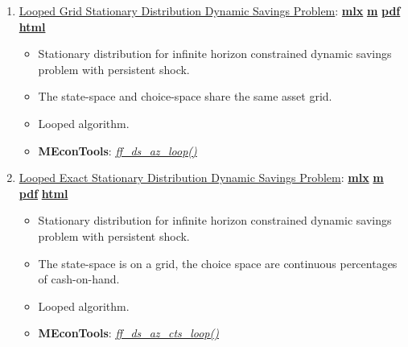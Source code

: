 \documentclass[
]{book}
\providecommand{\tightlist}{%
  \setlength{\itemsep}{0pt}\setlength{\parskip}{0pt}}
\begin{document}
\begin{enumerate}
\def\labelenumi{\arabic{enumi}.}
\tightlist
\item
  \href{https://fanwangecon.github.io/MEconTools/MEconTools/doc/ds/htmlpdfm/fx_ds_az_loop.html}{Looped Grid Stationary Distribution Dynamic Savings Problem}: \href{https://github.com/FanWangEcon/MEconTools/blob/master/MEconTools/doc/ds/fx_ds_az_loop.mlx}{\textbf{mlx}} \textbar{} \href{https://github.com/FanWangEcon/MEconTools/blob/master/MEconTools/doc/ds/htmlpdfm/fx_ds_az_loop.m}{\textbf{m}} \textbar{} \href{https://github.com/FanWangEcon/MEconTools/blob/master/MEconTools/doc/ds/htmlpdfm/fx_ds_az_loop.pdf}{\textbf{pdf}} \textbar{} \href{https://fanwangecon.github.io/MEconTools/MEconTools/doc/ds/htmlpdfm/fx_ds_az_loop.html}{\textbf{html}}

  \begin{itemize}
  \tightlist
  \item
    Stationary distribution for infinite horizon constrained dynamic savings problem with persistent shock.
  \item
    The state-space and choice-space share the same asset grid.
  \item
    Looped algorithm.
  \item
    \textbf{MEconTools}: \emph{\href{https://github.com/FanWangEcon/MEconTools/blob/master/MEconTools/ds/ff_ds_az_loop.m}{ff\_ds\_az\_loop()}}
  \end{itemize}
\item
  \href{https://fanwangecon.github.io/MEconTools/MEconTools/doc/ds/htmlpdfm/fx_ds_az_cts_loop.html}{Looped Exact Stationary Distribution Dynamic Savings Problem}: \href{https://github.com/FanWangEcon/MEconTools/blob/master/MEconTools/doc/ds/fx_ds_az_cts_loop.mlx}{\textbf{mlx}} \textbar{} \href{https://github.com/FanWangEcon/MEconTools/blob/master/MEconTools/doc/ds/htmlpdfm/fx_ds_az_cts_loop.m}{\textbf{m}} \textbar{} \href{https://github.com/FanWangEcon/MEconTools/blob/master/MEconTools/doc/ds/htmlpdfm/fx_ds_az_cts_loop.pdf}{\textbf{pdf}} \textbar{} \href{https://fanwangecon.github.io/MEconTools/MEconTools/doc/ds/htmlpdfm/fx_ds_az_cts_loop.html}{\textbf{html}}

  \begin{itemize}
  \tightlist
  \item
    Stationary distribution for infinite horizon constrained dynamic savings problem with persistent shock.
  \item
    The state-space is on a grid, the choice space are continuous percentages of cash-on-hand.
  \item
    Looped algorithm.
  \item
    \textbf{MEconTools}: \emph{\href{https://github.com/FanWangEcon/MEconTools/blob/master/MEconTools/ds/ff_ds_az_cts_loop.m}{ff\_ds\_az\_cts\_loop()}}
  \end{itemize}
\end{enumerate}
\end{document}
